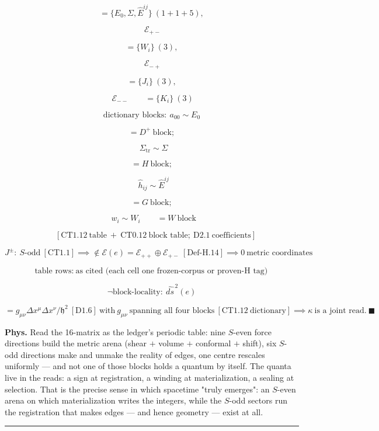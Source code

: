 \begin{theorem}
\[
= \{E_0,\Sigma,\hat E^{ij}\}\ (1{+}1{+}5),
\]

\[
\ \mathcal E_{+-}
\]

\[
= \{W_i\}\ (3),
\]

\[
\ \mathcal E_{-+}
\]

\[
= \{J_i\}\ (3),
\]

\[
\ \mathcal E_{--}\qquad = \{K_i\}\ (3)
\]

\[
\text{dictionary blocks}:\ a_{00}\sim E_0
\]

\[
= D^+\ \text{block};
\]

\[
\ \ \Sigma_{\mathrm{tr}}\sim\Sigma
\]

\[
= H\ \text{block};
\]

\[
\ \ \hat h_{ij}\sim\hat E^{ij}
\]

\[
= G\ \text{block};
\]

\[
\ \ w_i\sim W_i\qquad = W\ \text{block}
\]

\[
\quad [\mathrm{CT1.12}\ \text{table}\ +\ \mathrm{CT0.12}\ \text{block table};\ \mathrm{D2.1}\ \text{coefficients}]
\]

\[
J^\pm:\ S\text{-odd}\ [\mathrm{CT1.1}]\implies\notin\mathcal E(e)=\mathcal E_{++}\oplus\mathcal E_{+-}\ [\mathrm{Def\text{-}H.14}]\implies0\ \text{metric coordinates}
\]

\[
\text{table rows}:\ \text{as cited (each cell one frozen-corpus or proven-H tag)}
\]

\[
\neg\text{block-locality}:\ \widehat{ds}^{\,2}(e)
\]

\[
= g_{\mu\nu}\Delta x^\mu\Delta x^\nu/\mathfrak h^2\ [\mathrm{D1.6}]\ \text{with}\ g_{\mu\nu}\ \text{spanning all four blocks}\ [\mathrm{CT1.12}\ \text{dictionary}]\implies\kappa\ \text{is a joint read}.\ \blacksquare
\]

\textbf{Phys.} Read the 16-matrix as the ledger's periodic table: nine $S$-even force directions build the metric arena (shear $+$ volume $+$ conformal $+$ shift), six $S$-odd directions make and unmake the reality of edges, one centre rescales uniformly — and not one of those blocks holds a quantum by itself. The quanta live in the reads: a sign at registration, a winding at materialization, a sealing at selection. That is the precise sense in which spacetime "truly emerges": an $S$-even arena on which materialization writes the integers, while the $S$-odd sectors run the registration that makes edges — and hence geometry — exist at all.

\vspace{2pt}\noindent\rule{\textwidth}{0.4pt}\vspace{2pt}

\end{theorem}

